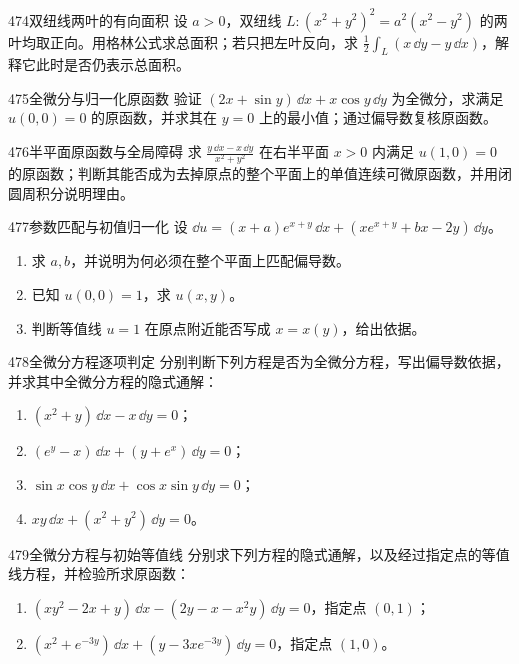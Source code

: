 \begin{exercise}{474}{双纽线两叶的有向面积}
设 $a>0$，双纽线 $L:(x^2+y^2)^2=a^2(x^2-y^2)$ 的两叶均取正向。用格林公式求总面积；若只把左叶反向，求 $\frac12\int_L(x\,\dd y-y\,\dd x)$，解释它此时是否仍表示总面积。
\end{exercise}

\begin{exercise}{475}{全微分与归一化原函数}
验证 $(2x+\sin y)\,\dd x+x\cos y\,\dd y$ 为全微分，求满足 $u(0,0)=0$ 的原函数，并求其在 $y=0$ 上的最小值；通过偏导数复核原函数。
\end{exercise}

\begin{exercise}{476}{半平面原函数与全局障碍}
求 $\frac{y\,\dd x-x\,\dd y}{x^2+y^2}$ 在右半平面 $x>0$ 内满足 $u(1,0)=0$ 的原函数；判断其能否成为去掉原点的整个平面上的单值连续可微原函数，并用闭圆周积分说明理由。
\end{exercise}

\begin{exercise}{477}{参数匹配与初值归一化}
设 $\dd u=(x+a)e^{x+y}\,\dd x+(xe^{x+y}+bx-2y)\,\dd y$。
\begin{enumerate}[label=(\arabic*)]
\item 求 $a,b$，并说明为何必须在整个平面上匹配偏导数。
\item 已知 $u(0,0)=1$，求 $u(x,y)$。
\item 判断等值线 $u=1$ 在原点附近能否写成 $x=x(y)$，给出依据。
\end{enumerate}
\end{exercise}

\begin{exercise}{478}{全微分方程逐项判定}
分别判断下列方程是否为全微分方程，写出偏导数依据，并求其中全微分方程的隐式通解：
\begin{enumerate}[label=(\arabic*)]
\item $(x^2+y)\,\dd x-x\,\dd y=0$；
\item $(e^y-x)\,\dd x+(y+e^x)\,\dd y=0$；
\item $\sin x\cos y\,\dd x+\cos x\sin y\,\dd y=0$；
\item $xy\,\dd x+(x^2+y^2)\,\dd y=0$。
\end{enumerate}
\end{exercise}

\begin{exercise}{479}{全微分方程与初始等值线}
分别求下列方程的隐式通解，以及经过指定点的等值线方程，并检验所求原函数：
\begin{enumerate}[label=(\arabic*)]
\item $(xy^2-2x+y)\,\dd x-(2y-x-x^2y)\,\dd y=0$，指定点 $(0,1)$；
\item $(x^2+e^{-3y})\,\dd x+(y-3xe^{-3y})\,\dd y=0$，指定点 $(1,0)$。
\end{enumerate}
\end{exercise}

